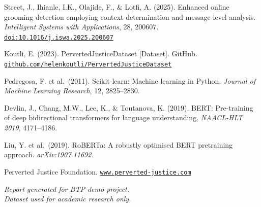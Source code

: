 \documentclass[12pt,a4paper]{article}
\begin{document}
\begin{enumerate}[leftmargin=*, label={[\arabic*]}]

  \item Street, J., Ihianle, I.K., Olajide, F., \& Lotfi, A. (2025).
        Enhanced online grooming detection employing context determination
        and message-level analysis.
        \textit{Intelligent Systems with Applications}, 28, 200607.
        \href{https://doi.org/10.1016/j.iswa.2025.200607}
             {\texttt{doi:10.1016/j.iswa.2025.200607}}

  \item Koutli, E. (2023). PervertedJusticeDataset [Dataset].
        GitHub.
        \href{https://github.com/helenkoutli/PervertedJusticeDataset}
             {\texttt{github.com/helenkoutli/PervertedJusticeDataset}}

  \item Pedregosa, F. et al.\ (2011). Scikit-learn: Machine learning in
        Python. \textit{Journal of Machine Learning Research}, 12,
        2825--2830.

  \item Devlin, J., Chang, M.W., Lee, K., \& Toutanova, K. (2019).
        BERT: Pre-training of deep bidirectional transformers for language
        understanding. \textit{NAACL-HLT 2019}, 4171--4186.

  \item Liu, Y. et al.\ (2019). RoBERTa: A robustly optimised BERT
        pretraining approach. \textit{arXiv:1907.11692}.

  \item Perverted Justice Foundation.
        \href{http://www.perverted-justice.com}
             {\texttt{www.perverted-justice.com}}

\end{enumerate}

\vfill
\begin{center}
  \small\textit{Report generated for BTP-demo project.}\\
  \small\textit{Dataset used for academic research only.}
\end{center}
\end{document}
